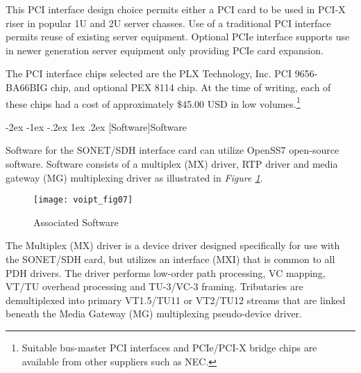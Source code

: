 \documentclass[letterpaper,final,notitlepage,twocolumn,10pt,twoside]{article}
\makeatletter
\let\large = \normalsize
\let\normalsize = \small
\let\small = \footnotesize
\let\footnotesize = \scriptsize
\let\scriptsize = \tiny
\renewcommand\section{\@startsection {section}{1}{\z@}%
                                   {-2ex \@plus -1ex \@minus -.2ex}%
                                   {1ex \@plus .2ex}%
                                   {\normalfont\large\bfseries}}
\renewcommand\subsection{\@startsection{subsection}{2}{\z@}%
                                     {-1.5ex \@plus -.5ex \@minus -.2ex}%
                                     {1ex \@plus .2ex}%
                                     {\normalfont\normalsize\bfseries}}
\renewcommand\paragraph{\@startsection{paragraph}{4}{\z@}%
                                    {1.5ex \@plus .5ex \@minus .2ex}%
                                    {-1em}%
                                    {\normalfont\normalsize\bfseries\slshape}}
\makeatother
\begin{document}
This PCI interface design choice permits either a PCI card to be used in PCI-X
riser in popular 1U and 2U server chasses.  Use of a traditional PCI interface
permits reuse of existing server equipment.  Optional PCIe interface supports
use in newer generation server equipment only providing PCIe card expansion.

The PCI interface chips selected are the PLX Technology, Inc. PCI 9656-BA66BIG
chip, and optional PEX 8114 chip.  At the time of writing, each of these chips
had a cost of approximately \$45.00 USD in low volumes.\footnote{Suitable
bus-master PCI interfaces and PCIe/PCI-X bridge chips are available from other
suppliers such as NEC.}

% 

\section[Software]{Software}

Software for the SONET/SDH interface card can utilize OpenSS7 open-source
software. Software consists of a multiplex (MX) driver, RTP driver and media
gateway (MG) multiplexing driver as illustrated in \textsl{Figure
\ref{figure:voipt_fig07}}.
\begin{figure}[htp]
\center\texttt{[image: voipt\_fig07]}
\caption[Software]{Associated Software}
\label{figure:voipt_fig07}
\end{figure}

The Multiplex (MX) driver is a device driver designed specifically for use with
the SONET/SDH card, but utilizes an interface (MXI) that is common to all PDH
drivers.  The driver performs low-order path processing, VC mapping, VT/TU
overhead processing and TU-3/VC-3 framing.  Tributaries are demultiplexed into
primary VT1.5/TU11 or VT2/TU12 streams that are linked beneath the Media Gateway
(MG) multiplexing pseudo-device driver.
\end{document}
